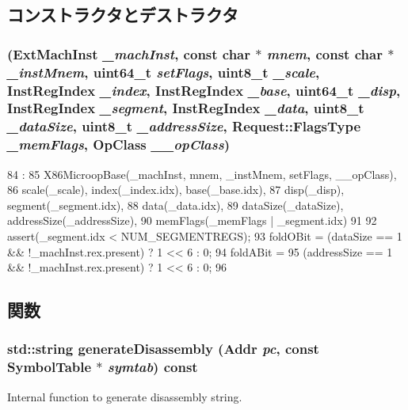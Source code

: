 \subsection{コンストラクタとデストラクタ}
\hypertarget{classX86ISA_1_1LdStOp_aba3a879f9ac4e6e45e95e8608e55615e}{
\subsubsection[{LdStOp}]{ ({\bf ExtMachInst} {\em \_\-machInst}, \/  const char $\ast$ {\em mnem}, \/  const char $\ast$ {\em \_\-instMnem}, \/  uint64\_\-t {\em setFlags}, \/  uint8\_\-t {\em \_\-scale}, \/  {\bf InstRegIndex} {\em \_\-index}, \/  {\bf InstRegIndex} {\em \_\-base}, \/  uint64\_\-t {\em \_\-disp}, \/  {\bf InstRegIndex} {\em \_\-segment}, \/  {\bf InstRegIndex} {\em \_\-data}, \/  uint8\_\-t {\em \_\-dataSize}, \/  uint8\_\-t {\em \_\-addressSize}, \/  {\bf Request::FlagsType} {\em \_\-memFlags}, \/  OpClass {\em \_\-\_\-opClass})}}
\label{classX86ISA_1_1LdStOp_aba3a879f9ac4e6e45e95e8608e55615e}



\begin{DoxyCode}
84                                    :
85         X86MicroopBase(_machInst, mnem, _instMnem, setFlags, __opClass),
86                 scale(_scale), index(_index.idx), base(_base.idx),
87                 disp(_disp), segment(_segment.idx),
88                 data(_data.idx),
89                 dataSize(_dataSize), addressSize(_addressSize),
90                 memFlags(_memFlags | _segment.idx)
91         {
92             assert(_segment.idx < NUM_SEGMENTREGS);
93             foldOBit = (dataSize == 1 && !_machInst.rex.present) ? 1 << 6 : 0;
94             foldABit =
95                 (addressSize == 1 && !_machInst.rex.present) ? 1 << 6 : 0;
96         }

\end{DoxyCode}


\subsection{関数}
\hypertarget{classX86ISA_1_1LdStOp_a95d323a22a5f07e14d6b4c9385a91896}{
\subsubsection[{generateDisassembly}]{\setlength{\rightskip}{0pt plus 5cm}std::string generateDisassembly ({\bf Addr} {\em pc}, \/  const {\bf SymbolTable} $\ast$ {\em symtab}) const}}
\label{classX86ISA_1_1LdStOp_a95d323a22a5f07e14d6b4c9385a91896}
Internal function to generate disassembly string. 


